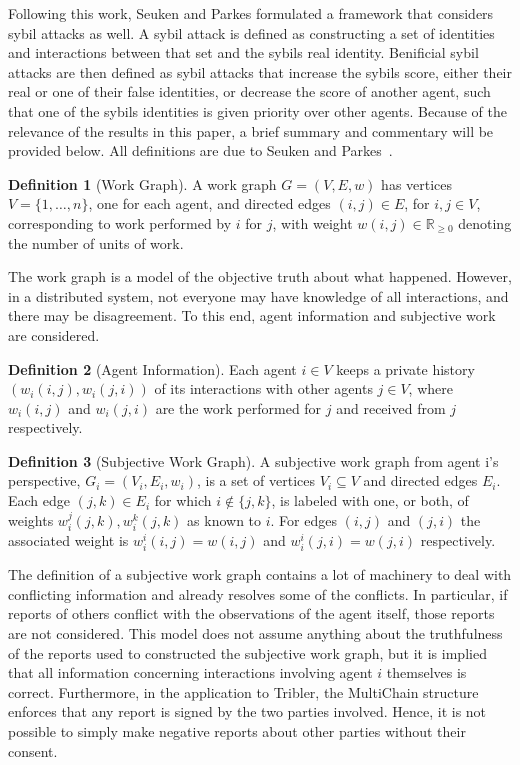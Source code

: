 \documentclass[a4paper,11pt]{book}
\newcommand{\bb}{\mathbb}
\theoremstyle{definition}
\newtheorem{definition}{Definition}
\begin{document}
Following this work, Seuken and Parkes \cite{seuken2014sybil} formulated a framework that considers sybil attacks as well. 
A sybil attack is defined as constructing a set of identities and interactions between that set and the sybils real identity.
Benificial sybil attacks are then defined as sybil attacks that increase the sybils score, either their real or one of
their false identities, or decrease the score of another  agent, such that one of the sybils identities
is given priority over other agents. Because of the relevance of the results in this paper, a brief summary
and commentary will be provided below. All definitions are due to Seuken and Parkes~\cite{seuken2014sybil}.

\begin{definition}[Work Graph]
    A work graph $G = (V, E, w)$ has vertices $V = \{1, \ldots, n\}$, one for each agent, and directed
    edges $(i, j) \in E$, for $i, j \in V$, corresponding to work performed by $i$ for $j$, with weight
    $w(i,j) \in \bb{R}_{\geq0}$ denoting the number of units of work.
    \label{def:work_graph}
\end{definition}

The work graph is a model of the objective truth about what happened. However, in a distributed system,
not everyone may have knowledge of all interactions, and there may be disagreement. To this end, agent
information and subjective work are considered.

\begin{definition}[Agent Information]
   Each agent $i \in V$ keeps a private history $(w_i(i,j), w_i(j, i))$ of its interactions with
   other agents $j \in V$, where $w_i(i,j)$ and $w_i(j,i)$ are the work performed for $j$ and
   received from $j$ respectively.
\end{definition}

\begin{definition}[Subjective Work Graph]
   A subjective work graph from agent i's perspective, $G_i = (V_i, E_i, w_i)$, is a set of vertices
   $V_i \subseteq V$ and directed edges $E_i$. Each edge $(j, k) \in E_i$ for which $i \notin \{j, k\}$,
   is labeled with one, or both, of weights $w^j_i(j, k), w_i^k(j, k)$ as known to $i$. For edges $(i,j)$
   and $(j,i)$ the associated weight is $w_i^i(i,j) = w(i,j)$ and $w_i^i(j, i) = w(j,i)$ respectively.
\end{definition}

The definition of a subjective work graph contains a lot of machinery to deal with conflicting information
and already resolves some of the conflicts. In particular, if reports of others conflict with the observations
of the agent itself, those reports are not considered. This model does not assume anything about the truthfulness
of the reports used to constructed the subjective work graph, but it is implied that all information concerning
interactions involving agent $i$ themselves is correct. Furthermore, in the application to Tribler, the
MultiChain structure enforces that any report is signed by the two parties involved. Hence, it is not possible
to simply make negative reports about other parties without their consent. 
\end{document}

